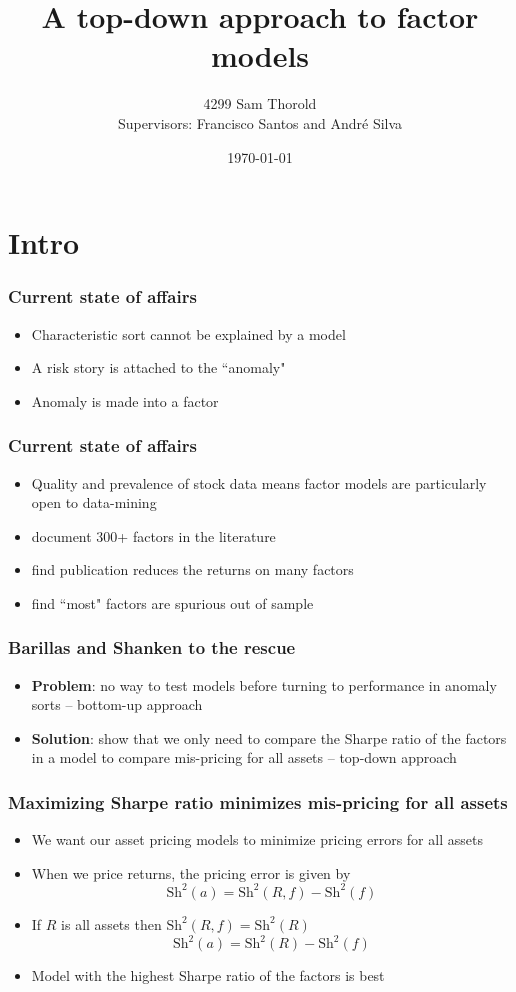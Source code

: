 \documentclass{beamer}
\title[Asset-Pricing]{A top-down approach to factor models}
\author[Thorold]{4299 Sam Thorold\\
                 Supervisors: Francisco Santos and Andr\'e Silva}
\institute{NHH and NOVA}
\date[April 2018]{\today}
\begin{document}
\frame{\titlepage}

\section{Intro}

\begin{frame}
  \frametitle{Current state of affairs}
  \begin{itemize}
    \item Characteristic sort cannot be explained by a model
    \item A risk story is attached to the ``anomaly"
    \item Anomaly is made into a factor
  \end{itemize}
\end{frame}

\begin{frame}
  \frametitle{Current state of affairs}
  \begin{itemize}
    \item Quality and prevalence of stock data means factor models are
    particularly open to data-mining
    \item \textcite{harvey2016and} document 300+ factors in the literature
    \item \textcite{mclean2016does} find publication reduces the returns on
    many factors
    \item \textcite{linnainmaa2016history} find ``most" factors are spurious
    out of sample
  \end{itemize}
\end{frame}

\begin{frame}
  \frametitle{Barillas and Shanken to the rescue}
  \begin{itemize}
    \item \textbf{Problem}:
    no way to test models before turning to performance in anomaly sorts
    -- bottom-up approach
    \item \textbf{Solution}:
    \textcite{barillas2016alpha} show that we only need to compare the Sharpe
    ratio of the factors in a model to compare mis-pricing for all assets
    -- top-down approach
  \end{itemize}
\end{frame}

\begin{frame}
\frametitle{Maximizing Sharpe ratio minimizes mis-pricing for all assets}
\begin{itemize}
    \item We want our asset pricing models to minimize pricing errors for
    all assets
    \item When we price returns, the pricing error is given by
    \[
    \text{Sh}^2(a) = \text{Sh}^2(R, f) - \text{Sh}^2(f)
    \]
    \item If $R$ is all assets then $\text{Sh}^2(R, f) = \text{Sh}^2(R)$
    \[
    \text{Sh}^2(a) = \text{Sh}^2(R) - \text{Sh}^2(f)
    \]
    \item Model with the highest Sharpe ratio of the factors is best
\end{itemize}
\end{frame}
\end{document}

